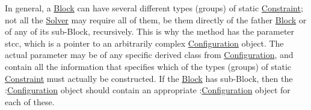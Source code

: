 In general, a \mbox{\hyperlink{class_s_m_spp__di__unipi__it_1_1_block}{Block}} can have several different types (groups) of static \mbox{\hyperlink{class_s_m_spp__di__unipi__it_1_1_constraint}{Constraint}}; not all the \mbox{\hyperlink{class_s_m_spp__di__unipi__it_1_1_solver}{Solver}} may require all of them, be them directly of the father \mbox{\hyperlink{class_s_m_spp__di__unipi__it_1_1_block}{Block}} or of any of its sub-\/\+Block, recursively. This is why the method has the parameter stcc, which is a pointer to an arbitrarily complex \mbox{\hyperlink{class_s_m_spp__di__unipi__it_1_1_configuration}{Configuration}} object. The actual parameter may be of any specific derived class from \mbox{\hyperlink{class_s_m_spp__di__unipi__it_1_1_configuration}{Configuration}}, and contain all the information that specifies which of the types (groups) of static \mbox{\hyperlink{class_s_m_spp__di__unipi__it_1_1_constraint}{Constraint}} must actually be constructed. If the \mbox{\hyperlink{class_s_m_spp__di__unipi__it_1_1_block}{Block}} has sub-\/\+Block, then the \+:\mbox{\hyperlink{class_s_m_spp__di__unipi__it_1_1_configuration}{Configuration}} object should contain an appropriate \+:\mbox{\hyperlink{class_s_m_spp__di__unipi__it_1_1_configuration}{Configuration}} object for each of these.


